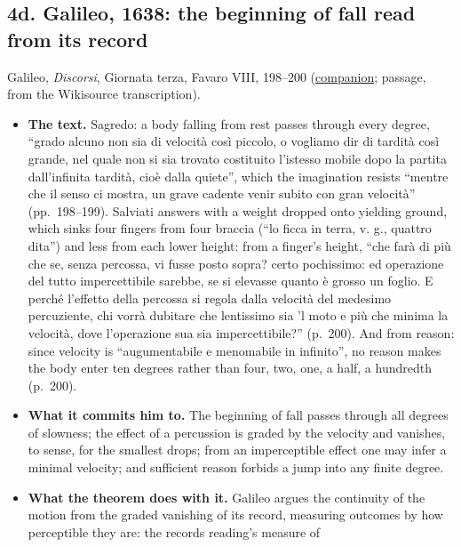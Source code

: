 \documentclass[11pt,a4paper]{article}
\newcommand{\tightlist}{\setlength{\itemsep}{0pt}\setlength{\parskip}{0pt}}
\begin{document}
\hypertarget{d.-galileo-1638-the-beginning-of-fall-read-from-its-record}{%
\subsection{4d. Galileo, 1638: the beginning of fall read from its
record}\label{d.-galileo-1638-the-beginning-of-fall-read-from-its-record}}

Galileo, \emph{Discorsi}, Giornata terza, Favaro VIII, 198--200
(\href{../docs/classics/Galileo_Discorsi_GiornataTerza_Favaro_it_wikisource.md}{companion};
passage, from the Wikisource transcription).

\begin{itemize}
\tightlist
\item
  \textbf{The text.} Sagredo: a body falling from rest passes through
  every degree, ``grado alcuno non sia di velocità così piccolo, o
  vogliamo dir di tardità così grande, nel quale non si sia trovato
  costituito l'istesso mobile dopo la partita dall'infinita tardità,
  cioè dalla quiete'', which the imagination resists ``mentre che il
  senso ci mostra, un grave cadente venir subito con gran velocità''
  (pp.~198--199). Salviati answers with a weight dropped onto yielding
  ground, which sinks four fingers from four braccia (``lo ficca in
  terra, v. g., quattro dita'') and less from each lower height: from a
  finger's height, ``che farà di più che se, senza percossa, vi fusse
  posto sopra? certo pochissimo: ed operazione del tutto impercettibile
  sarebbe, se si elevasse quanto è grosso un foglio. E perché l'effetto
  della percossa si regola dalla velocità del medesimo percuziente, chi
  vorrà dubitare che lentissimo sia 'l moto e più che minima la
  velocità, dove l'operazione sua sia impercettibile?'' (p.~200). And
  from reason: since velocity is ``augumentabile e menomabile in
  infinito'', no reason makes the body enter ten degrees rather than
  four, two, one, a half, a hundredth (p.~200).
\item
  \textbf{What it commits him to.} The beginning of fall passes through
  all degrees of slowness; the effect of a percussion is graded by the
  velocity and vanishes, to sense, for the smallest drops; from an
  imperceptible effect one may infer a minimal velocity; and sufficient
  reason forbids a jump into any finite degree.
\item
  \textbf{What the theorem does with it.} Galileo argues the continuity
  of the motion from the graded vanishing of its record, measuring
  outcomes by how perceptible they are: the records reading's measure of

\end{itemize}
\end{document}
